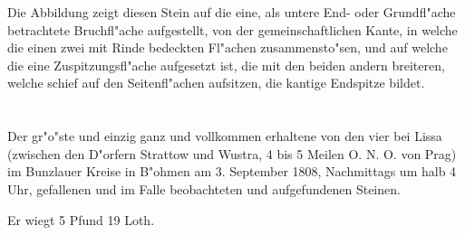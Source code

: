 \documentclass[a4paper, 11pt, oneside, german]{article}
\begin{document}
Die Abbildung zeigt diesen Stein auf die eine, als untere End- oder Grundfl"ache betrachtete Bruchfl"ache aufgestellt, von der gemeinschaftlichen Kante, in welche die einen zwei mit Rinde bedeckten Fl"achen zusammensto"sen, und auf welche die eine Zuspitzungsfl"ache aufgesetzt ist, die mit den beiden andern breiteren, welche schief auf den Seitenfl"achen aufsitzen, die kantige Endspitze bildet.
\clearpage
\section{}
\subsection{}
\paragraph{}
Der gr"o"ste und einzig ganz und vollkommen erhaltene von den vier bei Lissa (zwischen den D"orfern Strattow und Wustra, 4 bis 5 Meilen O. N. O. von Prag) im Bunzlauer Kreise in B"ohmen am 3. September 1808, Nachmittags um halb 4 Uhr, gefallenen und im Falle beobachteten und aufgefundenen Steinen.

Er wiegt 5 Pfund 19 Loth.
\end{document}

